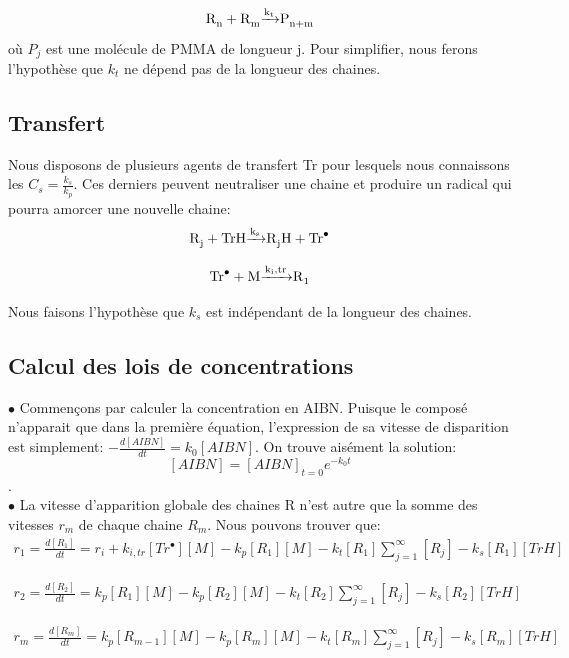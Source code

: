 \documentclass[a4paper,oneside,12pt]{article}
\begin{document}
\begin{equation}
\ce{R_{n} + R_{m} \xrightarrow{k_t} P_{n+m}}
\end{equation}
où $P_{j}$ est une molécule de PMMA de longueur j. Pour simplifier, nous ferons l'hypothèse que $k_{t}$ ne dépend pas de la longueur des chaines.

\subsection{Transfert}
Nous disposons de plusieurs agents de transfert Tr pour lesquels nous connaissons les $C_{s}=\frac{k_{s}}{k_{p}}$. Ces derniers peuvent neutraliser une chaine et produire un radical qui pourra amorcer une nouvelle chaine:
\begin{equation}
\ce{R_{j} + TrH \xrightarrow{k_s} R_{j}H + Tr^{\bullet}}
\end{equation}

\begin{equation}
\ce{Tr^{\bullet} + M \xrightarrow{k_i,tr} R_{1}}
\end{equation}

Nous faisons l'hypothèse que $k_s$ est indépendant de la longueur des chaines.
\subsection{Calcul des lois de concentrations}
$\bullet$ Commençons par calculer la concentration en AIBN. Puisque le composé n'apparait que dans la première équation, l'expression de sa vitesse de disparition est simplement: $-\frac{d[AIBN]}{dt}=k_{0}[AIBN]$. On trouve aisément la solution: $$[AIBN]=[AIBN]_{t=0}e^{-k_{0}t} $$.\\

$\bullet$ La vitesse d'apparition globale des chaines R n'est autre que la somme des vitesses $r_{m}$ de chaque chaine $R_{m}$. Nous pouvons trouver que:
\begin{align*}
r_{1}=\frac{d[R_{1}]}{dt}=r_{i}+k_{i,tr}[Tr^{\bullet}][M]-k_p[R_{1}][M]-k_{t}[R_1]\sum\limits_{j=1}^\infty[R_j]-k_{s}[R_{1}][TrH]
\end{align*}

\begin{align*}
r_{2}=\frac{d[R_{2}]}{dt}=k_p[R_{1}][M]-k_p[R_{2}][M]-k_{t}[R_2]\sum\limits_{j=1}^\infty[R_j]-k_{s}[R_{2}][TrH]
\end{align*}

\begin{align*}
r_{m}=\frac{d[R_{m}]}{dt}=k_p[R_{m-1}][M]-k_p[R_{m}][M]-k_{t}[R_m]\sum\limits_{j=1}^\infty[R_j]-k_{s}[R_{m}][TrH]
\end{align*}
\end{document}
